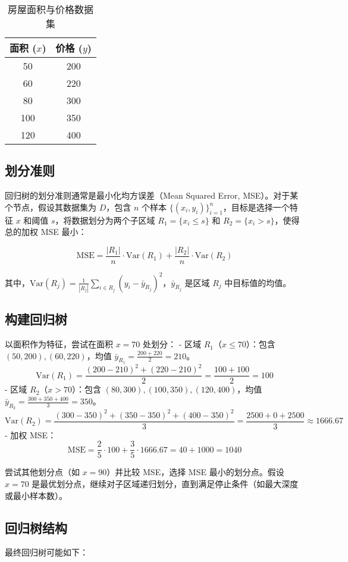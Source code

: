 \documentclass{article}
\begin{document}
\begin{table}[h]
\centering
\begin{tabular}{|c|c|}
\hline
面积 ($x$) & 价格 ($y$) \\
\hline
50 & 200 \\
60 & 220 \\
80 & 300 \\
100 & 350 \\
120 & 400 \\
\hline
\end{tabular}
\caption{房屋面积与价格数据集}
\end{table}

\subsection{划分准则}
回归树的划分准则通常是最小化均方误差（Mean Squared Error, MSE）。对于某个节点，假设其数据集为 $D$，包含 $n$ 个样本 $\{(x_i, y_i)\}_{i=1}^n$，目标是选择一个特征 $x$ 和阈值 $s$，将数据划分为两个子区域 $R_1 = \{x_i \leq s\}$ 和 $R_2 = \{x_i > s\}$，使得总的加权 MSE 最小：

\[
\text{MSE} = \frac{|R_1|}{n} \cdot \text{Var}(R_1) + \frac{|R_2|}{n} \cdot \text{Var}(R_2)
\]

其中，$\text{Var}(R_j) = \frac{1}{|R_j|} \sum_{i \in R_j} (y_i - \bar{y}_{R_j})^2$，$\bar{y}_{R_j}$ 是区域 $R_j$ 中目标值的均值。

\subsection{构建回归树}
以面积作为特征，尝试在面积 $x = 70$ 处划分：
- 区域 $R_1$（$x \leq 70$）：包含 $(50, 200), (60, 220)$，均值 $\bar{y}_{R_1} = \frac{200 + 220}{2} = 210$。
  \[
  \text{Var}(R_1) = \frac{(200 - 210)^2 + (220 - 210)^2}{2} = \frac{100 + 100}{2} = 100
  \]
- 区域 $R_2$（$x > 70$）：包含 $(80, 300), (100, 350), (120, 400)$，均值 $\bar{y}_{R_2} = \frac{300 + 350 + 400}{3} = 350$。
  \[
  \text{Var}(R_2) = \frac{(300 - 350)^2 + (350 - 350)^2 + (400 - 350)^2}{3} = \frac{2500 + 0 + 2500}{3} \approx 1666.67
  \]
- 加权 MSE：
  \[
  \text{MSE} = \frac{2}{5} \cdot 100 + \frac{3}{5} \cdot 1666.67 = 40 + 1000 = 1040
  \]

尝试其他划分点（如 $x = 90$）并比较 MSE，选择 MSE 最小的划分点。假设 $x = 70$ 是最优划分点，继续对子区域递归划分，直到满足停止条件（如最大深度或最小样本数）。

\subsection{回归树结构}
最终回归树可能如下：
\end{document}
